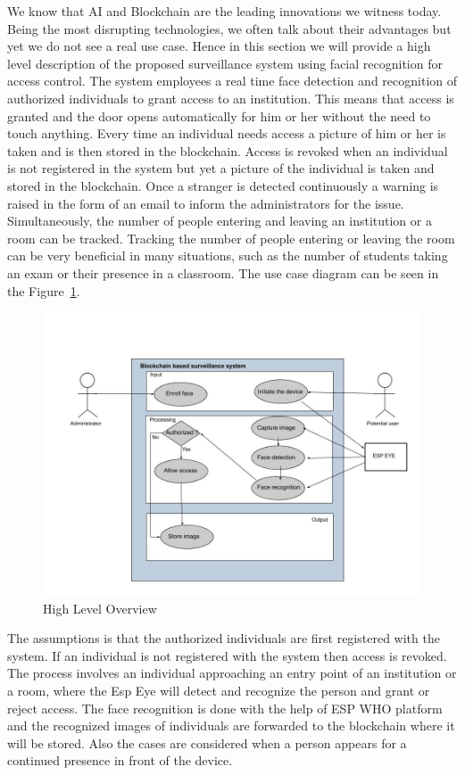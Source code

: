 We know that AI and Blockchain are the leading innovations we witness today. Being the most disrupting technologies, we often talk about their advantages but yet we do not see a real use case. Hence in this section we will provide a high level description of the proposed surveillance system using facial recognition for access control. The system employees a real time face detection and recognition of authorized individuals to grant access to an institution. This means that access is granted and the door opens automatically for him or her without the need to touch anything. Every time an individual needs access a picture of him or her is taken and is then stored in the blockchain. Access is revoked when an individual is not registered in the system but yet a picture of the individual is taken and stored in the blockchain. Once a stranger is detected continuously a warning is raised in the form of an email to inform the administrators for the issue. Simultaneously, the number of people entering and leaving an institution or a room can be tracked. Tracking the number of people entering or leaving the room can be very beneficial in many situations, such as the number of students taking an exam or their presence in a classroom. The use case diagram can be seen in the Figure~\ref{fig:use_case}. 

\begin{figure}[!htb]
    \centering
    \includegraphics[width=1\textwidth]{figures/use_case.jpg}
    \caption{High Level Overview}
    \label{fig:use_case}
\end{figure}


The assumptions is that the authorized individuals are first registered with the system. If an individual is not registered with the system then access is revoked. The process involves an individual approaching an entry point of an institution or a room, where the Esp Eye will detect and recognize the person and grant or reject access. The face recognition is done with the help of ESP WHO \cite{espwho} platform and the recognized images of individuals are forwarded to the blockchain where it will be stored. Also the cases are considered when a person appears for a continued presence in front of the device. 






